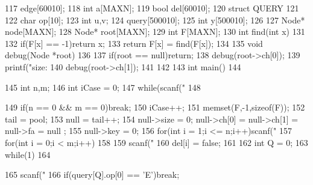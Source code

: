 \documentclass[11pt]{article}
\begin{document}
\begin{Code}
{117   }edge[60010];
118   int a[MAXN];
119   bool del[60010];
120   struct QUERY
121   {
122       char op[10];
123       int u,v;
124   }query[500010];
125   int y[500010];
126
127   Node* node[MAXN];
128   Node* root[MAXN];
129   int F[MAXN];
130   int find(int x)
131   {
132       if(F[x] == -1)return x;
133       return F[x] = find(F[x]);
134   }
135   void debug(Node *root)
136   {
137       if(root == null)return;
138       debug(root->ch[0]);
139       printf("size: %
140       debug(root->ch[1]);
141   }
142
143   int main()
144   {
145       int n,m;
146       int iCase = 0;
147       while(scanf("%
148       {
149           if(n == 0 && m == 0)break;
150           iCase++;
151           memset(F,-1,sizeof(F));
152           tail = pool;
153           null = tail++;
154           null->size = 0; null->ch[0] = null->ch[1] = null->fa = null
                 ;
155           null->key = 0;
156           for(int i = 1;i <= n;i++)scanf("%
157           for(int i = 0;i < m;i++)
158           {
159                scanf("%
160                del[i] = false;
161           }
162           int Q = 0;
163           while(1)
164           {
165                scanf("%
166                if(query[Q].op[0] == 'E')break;


}}}
\end{Code}
\end{document}
